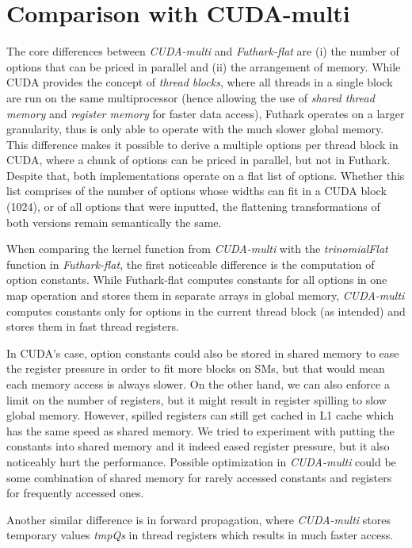 \section{Comparison with CUDA-multi}
\label{chapter:section:multiflatdifference}
The core differences between \textit{CUDA-multi} and \textit{Futhark-flat} are (i) the number of options that can be priced in parallel and (ii) the arrangement of memory. While CUDA provides the concept of \textit{thread blocks}, where all threads in a single block are run on the same multiprocessor (hence allowing the use of \textit{shared thread memory} and \textit{register memory} for faster data access), Futhark operates on a larger granularity, thus is only able to operate with the much slower global memory. This difference makes it possible to derive a multiple options per thread block in CUDA, where a chunk of options can be priced in parallel, but not in Futhark. Despite that, both implementations operate on a flat list of options. Whether this list comprises of the number of options whose widths can fit in a CUDA block (1024), or of all options that were inputted, the flattening transformations of both versions remain semantically the same.

When comparing the kernel function from \textit{CUDA-multi} with the \textit{trinomialFlat} function in \textit{Futhark-flat}, the first noticeable difference is the computation of option constants. While Futhark-flat computes constants for all options in one map operation and stores them in separate arrays in global memory, \textit{CUDA-multi} computes constants only for options in the current thread block (as intended) and stores them in fast thread registers.

In CUDA's case, option constants could also be stored in shared memory to ease the register pressure in order to fit more blocks on SMs, but that would mean each memory access is always slower. On the other hand, we can also enforce a limit on the number of registers, but it might result in register spilling to slow global memory. However, spilled registers can still get cached in L1 cache which has the same speed as shared memory. We tried to experiment with putting the constants into shared memory and it indeed eased register pressure, but it also noticeably hurt the performance. Possible optimization in \textit{CUDA-multi} could be some combination of shared memory for rarely accessed constants and registers for frequently accessed ones.

Another similar difference is in forward propagation, where \textit{CUDA-multi} stores temporary values \textit{tmpQs} in thread registers which results in much faster access.

